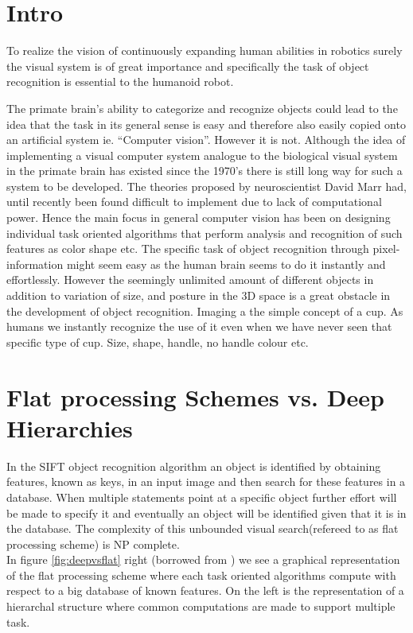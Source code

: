 \section{Intro}

To realize the vision of continuously expanding human abilities in robotics surely the visual system is of great importance and specifically the task of object recognition is essential to the humanoid robot.

The primate brain's ability to categorize and recognize objects could lead to the idea that the task in its general sense is easy and therefore also easily copied onto an artificial system ie. “Computer vision”. However it is not.
Although the idea of implementing a visual computer system analogue to the biological visual system in the primate brain has existed since the 1970's there is still long way for such a system to be developed. The theories proposed by neuroscientist David Marr \citep{VisualHierarchy} had, until recently been found difficult to implement due to lack of computational power. Hence the main focus in general computer vision has been on designing individual task oriented algorithms that perform analysis and recognition of such features as color shape etc.
The specific task of object recognition through pixel-information might seem easy as the human brain seems to do it instantly and effortlessly. However the seemingly unlimited amount of different objects in addition to variation of size, and posture in the 3D space is a great obstacle in the development of object recognition. Imaging a the simple concept of a cup. As humans we instantly recognize the use of it even when we have never seen that specific type of cup. Size, shape, handle, no handle colour etc.


\section*{Flat processing Schemes vs. Deep Hierarchies}

In the SIFT object recognition algorithm an object is identified by obtaining features, known as keys, in an input image and then search for these features in a database. When multiple statements point at a specific object further effort will be made to specify it and eventually an object will be identified given that it is in the database. The complexity of this unbounded visual search(refereed to as flat processing scheme) is NP complete\citep{fidler2009learning}.\\
In figure \ref{fig:deepvsflat} right (borrowed from \citep{VisualHierarchy}) we see a graphical representation of the flat processing scheme where each task oriented algorithms compute with respect to a big database of known features. On the left is the representation of a hierarchal structure where common computations are made to support multiple task.

